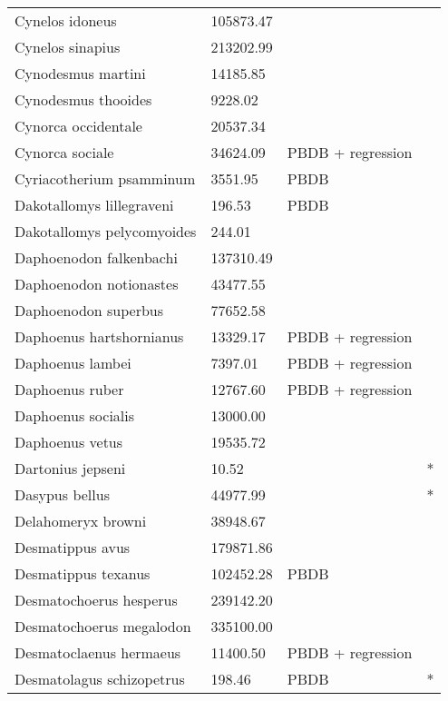 \documentclass{article}
\begin{document}
\begin{center}
\begin{longtable}{p{} p{} p{} p{}}
    Cynelos idoneus & 105873.47 & \cite{Tomiya2013} &  \\ 
    Cynelos sinapius & 213202.99 & \cite{Tomiya2013} &  \\ 
    Cynodesmus martini & 14185.85 & \cite{Tomiya2013} &  \\ 
    Cynodesmus thooides & 9228.02 & \cite{Tomiya2013} &  \\ 
    Cynorca occidentale & 20537.34 & \cite{Tomiya2013} &  \\ 
    Cynorca sociale & 34624.09 & PBDB + regression &  \\ 
    Cyriacotherium psamminum & 3551.95 & PBDB &  \\ 
    Dakotallomys lillegraveni & 196.53 & PBDB &  \\ 
    Dakotallomys pelycomyoides & 244.01 & \cite{Mihlbachler2006} &  \\ 
    Daphoenodon falkenbachi & 137310.49 & \cite{Tomiya2013} &  \\ 
    Daphoenodon notionastes & 43477.55 & \cite{Tomiya2013} &  \\ 
    Daphoenodon superbus & 77652.58 & \cite{Tomiya2013} &  \\ 
    Daphoenus hartshornianus & 13329.17 & PBDB + regression &  \\ 
    Daphoenus lambei & 7397.01 & PBDB + regression &  \\ 
    Daphoenus ruber & 12767.60 & PBDB + regression &  \\ 
    Daphoenus socialis & 13000.00 & \cite{McKenna2011} &  \\ 
    Daphoenus vetus & 19535.72 & \cite{Tomiya2013} &  \\ 
    Dartonius jepseni & 10.52 & \cite{Hay1969} & * \\ 
    Dasypus bellus & 44977.99 & \cite{Smith2004} & * \\ 
    Delahomeryx browni & 38948.67 & \cite{Tomiya2013} &  \\ 
    Desmatippus avus & 179871.86 & \cite{Tomiya2013} &  \\ 
    Desmatippus texanus & 102452.28 & PBDB &  \\ 
    Desmatochoerus hesperus & 239142.20 & \cite{McGrew1939} &  \\ 
    Desmatochoerus megalodon & 335100.00 & \cite{McKenna2011} &  \\ 
    Desmatoclaenus hermaeus & 11400.50 & PBDB + regression &  \\ 
    Desmatolagus schizopetrus & 198.46 & PBDB & * \\ 

\end{longtable}
\end{center}
\end{document}
